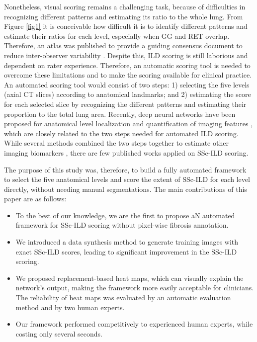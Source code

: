 Nonetheless, visual scoring remains a challenging task, because of difficulties in recognizing different patterns and estimating its ratio to the whole lung. From Figure \ref{fig1} it is conceivable how difficult it is to identify different patterns and estimate their ratios for each level, especially when GG and RET overlap. Therefore, an atlas was published to provide a guiding consensus document to reduce inter-observer variability \cite{Williamson2021}. Despite this, ILD scoring is still laborious and dependent on rater experience. Therefore, an automatic scoring tool is needed to overcome these limitations \cite{Collins1994, Sverzellati2011} and to make the scoring available for clinical practice. An automated scoring tool would consist of two steps: 1) selecting the five levels (axial CT slices) according to anatomical landmarks; and 2) estimating the score for each selected slice by recognizing the different patterns and estimating their proportion to the total lung area. Recently, deep neural networks have been proposed for anatomical level localization \cite{Belharbi2017} and quantification of imaging features \cite{Chassagnon2020, GonzalezSerrano2018, Gonzalez2018}, which are closely related to the two steps needed for automated ILD scoring. While several methods combined the two steps together to estimate other imaging biomarkers \cite{Wang2017, Dabiri2020, Bridge2018, Shadmi2018}, there are few published works applied on SSc-ILD scoring. 

The purpose of this study was, therefore, to build a fully automated framework to select the five anatomical levels and score the extent of SSc-ILD for each level directly, without needing manual segmentations. The main contributions of this paper are as follows:
\begin{itemize}
  \item To the best of our knowledge, we are the first to propose aN automated framework for SSc-ILD scoring without pixel-wise fibrosis annotation. 
  \item We introduced a data synthesis method to generate training images with exact SSc-ILD scores, leading to significant improvement in the SSc-ILD scoring.
  \item We proposed replacement-based heat maps, which can visually explain the network’s output, making the framework more easily acceptable for clinicians. The reliability of heat maps was evaluated by an automatic evaluation method and by two human experts.
  \item Our framework performed competitively to experienced human experts, while costing only several seconds.
\end{itemize}


